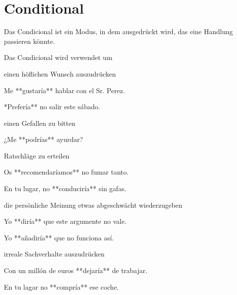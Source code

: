 \section*{Conditional}

Das Condicional ist ein Modus, in dem ausgedrückt wird, das eine Handlung passieren könnte.

\begin{highlight}
Das Condicional wird verwendet um

\begin{compactitem}
    \item einen höflichen Wunsch auszudrücken
    \begin{compactitem}\itshape
        \item Me **gustaría** hablar con el Sr. Perez.
        \item **Prefería** no salir este sábado.
    \end{compactitem}
    \item einen Gefallen zu bitten
    \begin{compactitem}\itshape
        \item ¿Me **podrías** ayurdar?
    \end{compactitem}
    \item Ratschläge zu erteilen
    \begin{compactitem}\itshape
        \item Os **recomendaríamos** no fumar tanto.
        \item En tu lugar, no **conduciría** sin gafas.
    \end{compactitem}
    \item die persönliche Meinung etwas abgeschwächt wiederzugeben
    \begin{compactitem}\itshape
        \item Yo **diría** que este argumente no vale.
        \item Yo **añadiría** que no funciona así.
    \end{compactitem}
    \item irreale Sachverhalte auszudrücken
    \begin{compactitem}\itshape
        \item Con un millón de euros **dejaría** de trabajar.
        \item En tu lagar no **compría** ese coche.
    \end{compactitem}
\end{compactitem}
\end{highlight}


